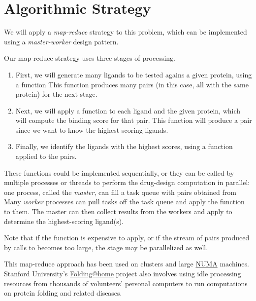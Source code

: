 \documentclass[letterpaper,10pt,openany,oneside]{sphinxmanual}
\begin{document}
\section{Algorithmic Strategy}
\label{intro/intro:algorithmic-strategy}
We will apply a \emph{map-reduce} strategy to this problem, which can be implemented using a \emph{master-worker} design pattern.

Our map-reduce strategy uses three stages of processing.
\begin{enumerate}
\item {} 
First, we will generate many ligands to be tested agains a given protein, using a function  This function produces many  pairs (in this case, all with the same protein) for the next stage.

\item {} 
Next, we will apply a  function to each ligand and the given protein,       which will compute the binding score for that  pair. This  function will produce a pair  since we want to know the highest-scoring ligands.

\item {} 
Finally, we identify the ligands with the highest scores, using a function  applied to the  pairs.

\end{enumerate}

These functions could be implemented sequentially, or they can be called by multiple processes or threads to perform the drug-design computation in parallel: one process, called the \emph{master}, can fill a task queue with pairs obtained from 
Many \emph{worker} processes can pull tasks off the task queue and apply the function  to them. The master can then collect results from the workers and apply  to determine the highest-scoring ligand(s).

Note that if the  function is expensive to apply, or if the stream of  pairs produced by calls to  becomes too large, the  stage may be parallelized as well.

This map-reduce approach has been used on clusters and large \href{http://en.wikipedia.org/wiki/Non-Uniform\_Memory\_Access}{NUMA} machines. Stanford University's \href{http://folding.stanford.edu/}{Folding@home} project also involves using idle processing resources from thousands of volunteers' personal computers to run computations on protein folding and related diseases.
\end{document}
